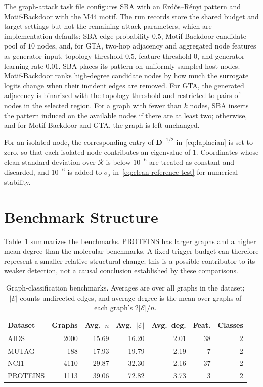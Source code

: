 \documentclass[journal]{IEEEtran}
\newcommand{\tabstyle}{%
  \footnotesize
  \setlength{\tabcolsep}{3pt}%
  \renewcommand{\arraystretch}{1.15}%
}
\newcommand{\bD}{\mathbf{D}}            %
\newcommand{\calE}{\mathcal{E}}         %
\newcommand{\calR}{\mathcal{R}}         %
\begin{document}
The graph-attack task file configures SBA with an Erd\H{o}s--R\'enyi pattern
and Motif-Backdoor with the M44 motif. The run records store the shared budget
and target settings but not the remaining attack parameters, which are
implementation defaults: SBA edge probability $0.5$, Motif-Backdoor candidate
pool of $10$ nodes, and, for GTA, two-hop adjacency and aggregated node
features as generator input, topology threshold $0.5$, feature threshold $0$,
and generator learning rate $0.01$. SBA places its pattern on uniformly
sampled host nodes. Motif-Backdoor ranks high-degree candidate nodes by how
much the surrogate logits change when their incident edges are removed. For
GTA, the generated adjacency is binarized with the topology threshold and
restricted to pairs of nodes in the selected region. For a graph with fewer
than $k$ nodes, SBA inserts the pattern induced on the available nodes if
there are at least two; otherwise, and for Motif-Backdoor and GTA, the graph is
left unchanged.

For an isolated node, the corresponding entry of $\bD^{-1/2}$
in~\eqref{eq:laplacian} is set to zero, so that each isolated node contributes
an eigenvalue of $1$. Coordinates whose clean standard deviation over $\calR$
is below $10^{-6}$ are treated as constant and discarded, and $10^{-6}$ is added
to $\sigma_j$ in~\eqref{eq:clean-reference-test} for numerical stability.

\section{Benchmark Structure}
\label{app:structure}
Table~\ref{tab:dataset_stats_graph} summarizes the benchmarks. PROTEINS has
larger graphs and a higher mean degree than the molecular benchmarks. A fixed
trigger budget can therefore represent a smaller relative structural change;
this is a possible contributor to its weaker detection, not a causal
conclusion established by these comparisons.

\begin{table}[t]
\caption{Graph-classification benchmarks. Averages are over all graphs in the
dataset; $|\calE|$ counts undirected edges, and average degree is the mean over
graphs of each graph's $2|\calE|/n$.}
\label{tab:dataset_stats_graph}
\centering
\tabstyle
\begin{tabular}{@{}lrrrrrr@{}}
\toprule
Dataset & Graphs & Avg.\ $n$ & Avg.\ $|\calE|$ & Avg.\ deg. & Feat. & Classes \\
\midrule
AIDS     & 2000 & 15.69 & 16.20 & 2.01 & 38 & 2 \\
MUTAG    &  188 & 17.93 & 19.79 & 2.19 &  7 & 2 \\
NCI1     & 4110 & 29.87 & 32.30 & 2.16 & 37 & 2 \\
PROTEINS & 1113 & 39.06 & 72.82 & 3.73 &  3 & 2 \\
\bottomrule
\end{tabular}
\end{table}
\end{document}
